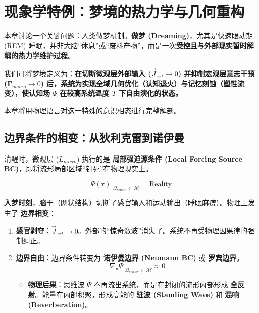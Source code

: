 \chapter{现象学特例：梦境的热力学与几何重构}
\label{chap:physics_of_dreams}

本章讨论一个关键问题：人类做梦机制。\textbf{做梦 (Dreaming)}，尤其是快速眼动期 (REM) 睡眠，并非大脑“休息”或“废料产物”，而是一次\textbf{受控且与外部现实暂时解耦的热力学维护过程}。

我们可将梦境定义为：\textbf{在切断微观层外部输入 ($\vec{J}_{ext} \to 0$) 并抑制宏观层意志干预 ($\mathbf{\Gamma}_{macro} \to 0$) 后，系统为实现全域几何优化（认知退火）与记忆刻蚀（塑性流变），使认知场 $\Psi$ 在较高系统温度 $T$ 下自由演化的状态。}

本章将用物理语言对这一特殊的意识相态进行完整解剖。

\section{边界条件的相变：从狄利克雷到诺伊曼}
\label{sec:section_3039}

清醒时，微观层 ($L_{micro}$) 执行的是 \textbf{局部强迫源条件 (Local Forcing Source BC)}，即将流形局部区域“钉死”在物理现实上。

\begin{equation}
\Psi(\mathbf{r}) \big|_{\Omega_{sensor} \subset \mathcal{M}} = \text{Reality}
\end{equation}

\textbf{入梦时刻}，脑干（网状结构）切断了感官输入和运动输出（睡眠麻痹）。物理上发生了 \textbf{边界相变}：

\begin{enumerate}
    \item \textbf{感官剥夺}：$\vec{J}_{ext} \to 0$。外部的“惊奇激波”消失了。系统不再受物理因果律的强制纠正。
    \item \textbf{边界自由}：边界条件转变为 \textbf{诺伊曼边界 (Neumann BC)} 或 \textbf{罗宾边界}。
    \begin{equation}
    \nabla_{\mathbf{n}} \Psi \big|_{\Omega_{sensor} \subset \mathcal{M}} \approx 0
    \end{equation}
    \begin{itemize}
        \item \textbf{物理后果}：思维波 $\Psi$ 不再流出系统，而是在封闭的流形内部形成 \textbf{全反射}。能量在内部积聚，形成高能的 \textbf{驻波 (Standing Wave)} 和 \textbf{混响 (Reverberation)}。
    \end{itemize}
\end{enumerate}

